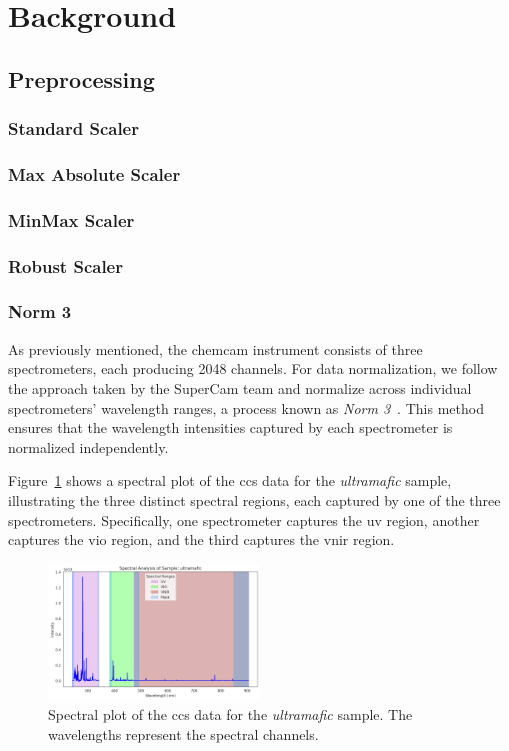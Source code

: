 \section{Background}\label{sec:background}
\subsection{Preprocessing}

\subsubsection{Standard Scaler}

\subsubsection{Max Absolute Scaler}

\subsubsection{MinMax Scaler}

\subsubsection{Robust Scaler}

\subsubsection{Norm 3}
As previously mentioned, the \gls{chemcam} instrument consists of three spectrometers, each producing 2048 channels.
For data normalization, we follow the approach taken by the SuperCam team and normalize across individual spectrometers' wavelength ranges, a process known as \textit{Norm 3}~\cite{andersonPostlandingMajorElement2022}.
This method ensures that the wavelength intensities captured by each spectrometer is normalized independently.

Figure~\ref{fig:spectral_plot} shows a spectral plot of the \gls{ccs} data for the \textit{ultramafic} sample, illustrating the three distinct spectral regions, each captured by one of the three spectrometers. Specifically, one spectrometer captures the \gls{uv} region, another captures the \gls{vio} region, and the third captures the \gls{vnir} region.

\begin{figure}[H]
	\centering
	\includegraphics[width=0.5\textwidth]{images/spectral_plot.png}
	\caption{Spectral plot of the \gls{ccs} data for the \textit{ultramafic} sample. The wavelengths represent the spectral channels.}
	\label{fig:spectral_plot}
\end{figure}

